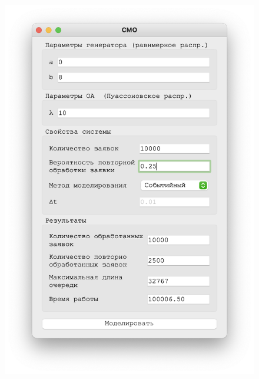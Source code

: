  \begin{figure}[!htb]
    \begin{minipage}{0.55\textwidth}
      \centering
      \includegraphics[width=1\linewidth]{10-25-s}
    \end{minipage}\hfill
    \begin{minipage}{0.55\textwidth}
      \centering

\end{minipage}
\end{figure}
